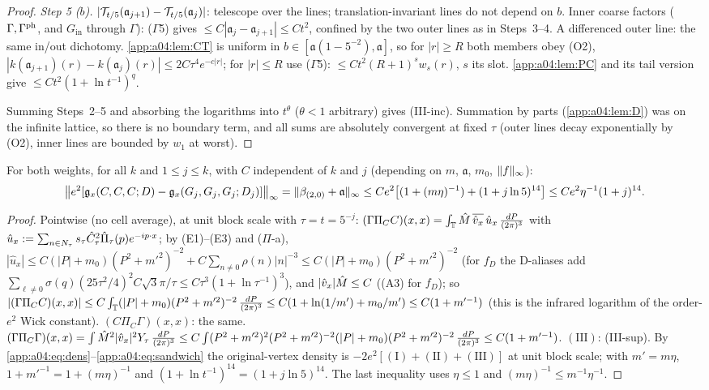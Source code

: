 \begin{proof}
\emph{Step 5 ($b$).} $|\mathcal T_{t/5}(\mathfrak a_{j+1})-\mathcal T_{t/5}(\mathfrak a_j)|$: telescope over the lines; translation-invariant lines do not depend on $b$. Inner coarse factors ($\Gamma,\Gamma^{\mathrm{ph}}$, and $G_{\mathrm{in}}$ through $\Gamma$): ($\Gamma$5) gives $\le C|\mathfrak a_j-\mathfrak a_{j+1}|\le Ct^2$, confined by the two outer lines as in Steps~3--4. A differenced outer line: the same in/out dichotomy. \cref{app:a04:lem:CT} is uniform in $b\in[\mathfrak a(1-5^{-2}),\mathfrak a]$, so for $|r|\ge R$ both members obey (O2), $|k(\mathfrak a_{j+1})(r)-k(\mathfrak a_j)(r)|\le2C\tau^4e^{-c|r|}$; for $|r|\le R$ use ($\Gamma$5): $\le Ct^2(R+1)^sw_s(r)$, $s$ its slot. \cref{app:a04:lem:PC} and its tail version give $\le Ct^2(1+\ln t^{-1})^q$.

Summing Steps~2--5 and absorbing the logarithms into $t^\theta$ ($\theta<1$ arbitrary) gives (III-inc). Summation by parts (\cref{app:a04:lem:D}) was on the infinite lattice, so there is no boundary term, and all sums are absolutely convergent at fixed $\tau$ (outer lines decay exponentially by (O2), inner lines are bounded by $w_1$ at worst).
\end{proof}

\begin{proposition}\label{app:a04:prop:S}
For both weights, for all $k$ and $1\le j\le k$, with $C$ independent of $k$ and $j$ (depending on $m$, $\mathfrak a$, $m_0$, $\lVert f\rVert_\infty$):
\[
\big\|e^2[\mathfrak g_x(C,C,C;D)-\mathfrak g_x(G_j,G_j,G_j;D_j)]\big\|_\infty=\lVert \beta_{(2,0)}+\mathfrak a\rVert_\infty\le Ce^2\big[(1+(m\eta)^{-1})+(1+j\ln5)^{14}\big]\le Ce^2\eta^{-1}(1+j)^{14}.
\]
\end{proposition}
\begin{proof}
Pointwise (no cell average), at unit block scale with $\tau=t=5^{-j}$: $(\Gamma\Pi_CC)(x,x)=\int_{\mathbb T}\hat M\,\overline{\hat v_x}\,\hat u_x\,\tfrac{dP}{(2\pi)^3}$ with $\hat u_x:=\sum_{n\in N_\tau}s_\tau\hat C_\tau^2\hat\Pi_\tau(p)e^{-ip\cdot x}$; by (E1)--(E3) and ($\Pi$-a), $|\hat u_x|\le C(|P|+m_0)(P^2+m'^2)^{-2}+C\sum_{n\ne0}\rho(n)|n|^{-3}\le C(|P|+m_0)(P^2+m'^2)^{-2}$ (for $f_D$ the D-aliases add $\sum_{\ell\ne0}\sigma(q)(25\tau^2/4)^2C\sqrt3\pi/\tau\le C\tau^3(1+\ln\tau^{-1})^3$), and $|\hat v_x|\hat M\le C$ ((A3) for $f_D$); so $|(\Gamma\Pi_CC)(x,x)|\le C\int_{\mathbb T}(|P|+m_0)(P^2+m'^2)^{-2}\,\tfrac{dP}{(2\pi)^3}\le C(1+\ln(1/m')+m_0/m')\le C(1+m'^{-1})$ (this is the infrared logarithm of the order-$e^2$ Wick constant). $(C\Pi_C\Gamma)(x,x)$: the same. $(\Gamma\Pi_C\Gamma)(x,x)=\int\hat M^2|\hat v_x|^2Y_\tau\,\tfrac{dP}{(2\pi)^3}\le C\int(P^2+m'^2)^2(P^2+m'^2)^{-2}(|P|+m_0)(P^2+m'^2)^{-2}\,\tfrac{dP}{(2\pi)^3}\le C(1+m'^{-1})$. $(\mathrm{III})$: (III-sup). By \eqref{app:a04:eq:dens}--\eqref{app:a04:eq:sandwich} the original-vertex density is $-2e^2[(\mathrm I)+(\mathrm{II})+(\mathrm{III})]$ at unit block scale; with $m'=m\eta$, $1+m'^{-1}=1+(m\eta)^{-1}$ and $(1+\ln t^{-1})^{14}=(1+j\ln5)^{14}$. The last inequality uses $\eta\le1$ and $(m\eta)^{-1}\le m^{-1}\eta^{-1}$.
\end{proof}

